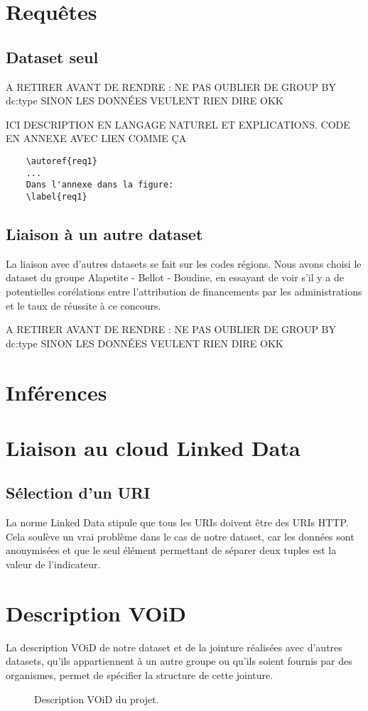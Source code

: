 \chapter{Requêtes}
\section{Dataset seul}

A RETIRER AVANT DE RENDRE : NE PAS OUBLIER DE GROUP BY dc:type SINON LES DONNÉES VEULENT RIEN DIRE OKK

ICI DESCRIPTION EN LANGAGE NATUREL ET EXPLICATIONS. CODE EN ANNEXE AVEC LIEN COMME ÇA
\begin{verbatim}
    \autoref{req1}
    ...
    Dans l'annexe dans la figure:
    \label{req1}
\end{verbatim}

\section{Liaison à un autre dataset}

La liaison avec d'autres datasets se fait sur les codes régions. Nous avons choisi le dataset du groupe Alapetite - Bellot - Boudine, en essayant de voir s'il y a de potentielles corélations entre l'attribution de financements par les administrations et le taux de réussite à ce concours.

A RETIRER AVANT DE RENDRE : NE PAS OUBLIER DE GROUP BY dc:type SINON LES DONNÉES VEULENT RIEN DIRE OKK

\chapter{Inférences}


\chapter{Liaison au cloud Linked Data}
\section{Sélection d'un URI}

La norme Linked Data stipule que tous les URIs doivent être des URIs HTTP. Cela soulève un vrai problème dans le cas de notre dataset, car les données sont anonymisées et que le seul élément permettant de séparer deux tuples est la valeur de l'indicateur.

\chapter{Description VOiD}

La description VOiD de notre dataset et de la jointure réalisées avec d'autres datasets, qu'ils appartiennent à un autre groupe ou qu'ils soient fournis par des organismes, permet de spécifier la structure de cette jointure.

\begin{figure}[H]

\caption{Description VOiD du projet.}
\end{figure}
